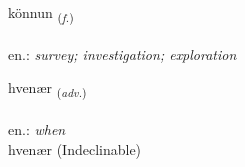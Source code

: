 \documentclass[frontgrid, backgrid]{flacards}\usepackage[]{graphicx}\usepackage[]{xcolor}
\begin{document}
\renewcommand{\flhead}{\vskip5pt \fboxsep=0pt {\small\bfseries\footnotesize Nafnorð | Noun}}
\renewcommand{\fcfoot}{\vskip5pt \fboxsep=0pt \hspace{2pt}{\small\bfseries\footnotesize 1K}}

\renewcommand{\blhead}{\vskip5pt {\small\bfseries\footnotesize Nafnorð | Noun }}
\renewcommand{\bcfoot}{\vskip5pt \hspace{2pt}{\small\bfseries\footnotesize 1K}}


{könnun \small{\textsubscript{(\textit{f.})}} \\[1ex] %
\textphonetic{[kʰœnʏn]} \\
en.: \emph{survey; investigation; exploration} \\  [2ex]
\renewcommand*{\arraystretch}{0.8}
}


\renewcommand{\flhead}{\vskip5pt \fboxsep=0pt {\small\bfseries\footnotesize Atviksorð | Adverb}}
\renewcommand{\fcfoot}{\vskip5pt \fboxsep=0pt \hspace{2pt}{\small\bfseries\footnotesize 1K}}

\renewcommand{\blhead}{\vskip5pt {\small\bfseries\footnotesize Atviksorð | Adverb }}
\renewcommand{\bcfoot}{\vskip5pt \hspace{2pt}{\small\bfseries\footnotesize 1K}}


{hvenær \small{\textsubscript{(\textit{adv.})}} \\[1ex]
\textphonetic{[kʰvɛːnair]} \\
en.: \emph{when} \\  [2ex]
hvenær (Indeclinable)}

\renewcommand{\flhead}{\vskip5pt \fboxsep=0pt {\small\bfseries\footnotesize Nafnorð | Noun}}
\renewcommand{\fcfoot}{\vskip5pt \fboxsep=0pt \hspace{2pt}{\small\bfseries\footnotesize 1K}}
\end{document}
